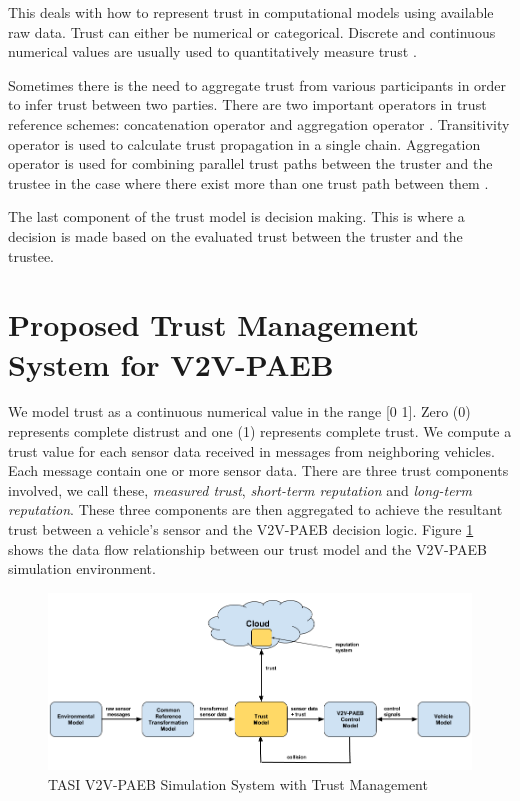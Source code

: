 \documentclass[conference]{IEEEtran}
\begin{document}
This deals with how to represent trust in computational models using available raw data. Trust can either be numerical or categorical. Discrete and continuous numerical values are usually used to quantitatively measure trust \cite{trustSurvey2015}.

Sometimes there is the need to aggregate trust from various participants in order to infer trust between two parties. There are two important operators in trust reference schemes: concatenation operator and aggregation operator \cite{trustAggreg06}. Transitivity operator is used to calculate trust propagation in a single chain. Aggregation operator is used for combining parallel trust paths between the truster and the trustee in the case where there exist more than one trust path between them \cite{logicUnProb2001}.

The last component of the trust model is decision making. This is where a decision is made based on the evaluated trust between the truster and the trustee.

\section{Proposed Trust Management System for V2V-PAEB} \label{contribution}
We model trust as a continuous numerical value in the range [0 1]. Zero (0) represents complete distrust and one (1) represents complete trust. We compute a trust value for each sensor data received in messages from neighboring vehicles. Each message contain one or more sensor data. There are three trust components involved, we call these, \textit{measured trust},  \textit{short-term reputation} and \textit{long-term reputation}. These three components are then aggregated to achieve the resultant trust between a vehicle’s sensor and the V2V-PAEB decision logic. Figure \ref{tforV2V} shows the data flow relationship between our trust model and the V2V-PAEB simulation environment.


\begin{figure}
  \includegraphics[width=\textwidth]{V2V_Tust_Management_System.png}
  \caption{TASI V2V-PAEB Simulation System with Trust Management}
  \label{tforV2V}
\end{figure}
\end{document}
